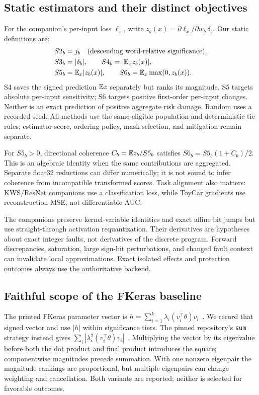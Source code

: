 \subsection{Static estimators and their distinct objectives}\label{sec:estimators}
For the companion's per-input loss $\ell_x$, write $z_b(x)=\partial\ell_x/\partial w_b\,\delta_b$. Our static definitions are:
\begin{align}
S2_b&=j_b \quad\text{(descending word-relative significance)},\nonumber\\
S3_b&=|\delta_b|,\qquad
S4_b=|\mathbb{E}_x z_b(x)|,\label{eq:static}\\
S5_b&=\mathbb{E}_x|z_b(x)|,\qquad
S6_b=\mathbb{E}_x\max(0,z_b(x)).\nonumber
\end{align}
S4 saves the signed prediction $\mathbb{E} z$ separately but ranks its magnitude. S5 targets absolute per-input sensitivity; S6 targets positive first-order per-input changes. Neither is an exact prediction of positive aggregate risk damage. Random uses a recorded seed. All methods use the same eligible population and deterministic tie rules; estimator score, ordering policy, mask selection, and mitigation remain separate.

For $S5_b>0$, directional coherence $C_b=\mathbb{E} z_b/S5_b$ satisfies $S6_b=S5_b(1+C_b)/2$. This is an algebraic identity when the same contributions are aggregated. Separate float32 reductions can differ numerically; it is not sound to infer coherence from incompatible transformed scores. Task alignment also matters: KWS/ResNet companions use a classification loss, while ToyCar gradients use reconstruction MSE, not differentiable AUC.

The companions preserve kernel-variable identities and exact affine bit jumps but use straight-through activation requantization. Their derivatives are hypotheses about exact integer faults, not derivatives of the discrete program. Forward discrepancies, saturation, large sign-bit perturbations, and changed fault context can invalidate local approximations. Exact isolated effects and protection outcomes always use the authoritative backend.

\subsection{Faithful scope of the FKeras baseline}
The printed FKeras parameter vector is $h=\sum_{i=1}^k\lambda_i(v_i^\top\theta)v_i$~\cite{weng2024fkeras}. We record that signed vector and use $|h|$ within significance tiers. The pinned repository's \texttt{sum} strategy instead gives $\sum_i|\lambda_i^2(v_i^\top\theta)v_i|$~\cite{fkerasSource}. Multiplying the vector by its eigenvalue before both the dot product and final product introduces the square; componentwise magnitudes precede summation. With one nonzero eigenpair the magnitude rankings are proportional, but multiple eigenpairs can change weighting and cancellation. Both variants are reported; neither is selected for favorable outcomes.

